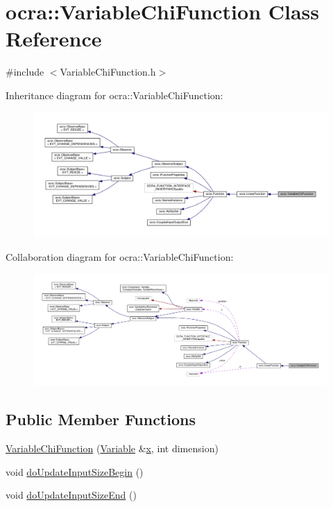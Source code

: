 \hypertarget{classocra_1_1VariableChiFunction}{}\section{ocra\+:\+:Variable\+Chi\+Function Class Reference}
\label{classocra_1_1VariableChiFunction}


{\ttfamily \#include $<$Variable\+Chi\+Function.\+h$>$}



Inheritance diagram for ocra\+:\+:Variable\+Chi\+Function\+:
\nopagebreak
\begin{figure}[H]
\begin{center}
\leavevmode
\includegraphics[width=350pt]{d6/d43/classocra_1_1VariableChiFunction__inherit__graph}
\end{center}
\end{figure}


Collaboration diagram for ocra\+:\+:Variable\+Chi\+Function\+:
\nopagebreak
\begin{figure}[H]
\begin{center}
\leavevmode
\includegraphics[width=350pt]{d8/d70/classocra_1_1VariableChiFunction__coll__graph}
\end{center}
\end{figure}
\subsection*{Public Member Functions}
\begin{DoxyCompactItemize}
\item 
\hyperlink{classocra_1_1VariableChiFunction_ac83eecf18f118396efdb5513923eeba6}{Variable\+Chi\+Function} (\hyperlink{classocra_1_1Variable}{Variable} \&\hyperlink{classocra_1_1Function_a28825886d1f149c87b112ec2ec1dd486}{x}, int dimension)
\item 
void \hyperlink{classocra_1_1VariableChiFunction_ad58b8fbb68e8cb27aab585f40875918f}{do\+Update\+Input\+Size\+Begin} ()
\item 
void \hyperlink{classocra_1_1VariableChiFunction_adbc1bb06d86e8ef65e8cdeb55db15353}{do\+Update\+Input\+Size\+End} ()
\end{DoxyCompactItemize}

